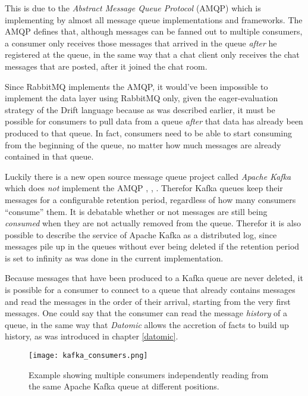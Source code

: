 This is due to the \textit{Abstract Message Queue Protocol}
(AMQP) which is implementing by almost all message queue
implementations and frameworks. The AMQP defines that,
although messages can be fanned out to multiple consumers,
a consumer only receives those messages that arrived in the
queue \textit{after} he registered at the queue, in the
same way that a chat client only receives the chat messages
that are posted, after it joined the chat room.

Since RabbitMQ implements the AMQP, it would've been impossible
to implement the data layer using RabbitMQ only, given the
eager-evaluation strategy of the Drift language because as was
described earlier, it must be possible for consumers to pull
data from a queue \textit{after} that data has already been
produced to that queue. In fact, consumers need to be able
to start consuming from the beginning of the queue, no matter
how much messages are already contained in that queue.

Luckily there is a new open source message queue project called
\textit{Apache Kafka} which does \textit{not} implement the AMQP
\cite{kafka}, \cite{kafkapaper}, \cite{kafkabook}.
Therefor Kafka queues keep their messages for a configurable
retention period, regardless of how many consumers ``consume''
them. It is debatable whether or not messages are still being
\textit{consumed} when they are not actually removed from the
queue. Therefor it is also possible to describe the service of
Apache Kafka as a distributed log, since messages pile up in
the queues without ever being deleted if the retention period
is set to infinity as was done in the current implementation.
\newline

Because messages that have been produced to a Kafka queue are
never deleted, it is possible for a consumer to connect to a queue
that already contains messages and read the messages in the order
of their arrival, starting from the very first messages. One could
say that the consumer can read the message \textit{history} of a
queue, in the same way that \textit{Datomic} allows the accretion
of facts to build up history, as was introduced in chapter \ref{datomic}.

\begin{wrapfigure}{l}{0.5\textwidth}
  \texttt{[image: kafka\_consumers.png]}
  \caption{Example showing multiple consumers independently reading from
           the same Apache Kafka queue at different positions.}
  \label{kafka-consumers}
\end{wrapfigure}

